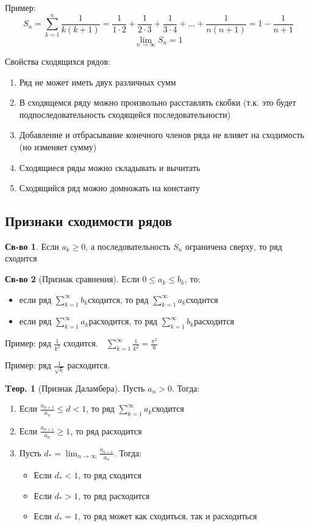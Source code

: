 \documentclass[a4paper,12pt]{article}
\numberwithin{figure}{section}
\theoremstyle{definition}
\newtheorem*{property}{Св-во}  %
\theoremstyle{definition}
\newtheorem{theorem}{Tеор.}[section]
\def\DS{\displaystyle}
\def\ntoinf{n\to\infty}
\def\leqs{\leqslant}
\def\geqs{\geqslant}
\def\rowak{$\DS\sum_{k=1}^{\infty}a_k$\space}
\begin{document}
\bigbreak
Пример:
\[ S_n = \sum_{k=1}^n \frac1{k(k+1)}
       = \frac1{1\cdot2} + \frac1{2\cdot3} + \frac1{3\cdot4} + ... + \frac1{n(n+1)}
       = 1 - \frac1{n+1} \]
\[ \lim_{\ntoinf}S_n = 1 \]
\bigskip

Свойства сходящихся рядов:
\begin{enumerate}
	\item Ряд не может иметь двух различных сумм
	\item В сходящемся ряду можно произвольно расставлять скобки
		  (т.к. это будет подпоследовательность сходящейся последовательности)
	\item Добавление и отбрасывание конечного членов ряда не влияет на сходимость (но изменяет сумму)
	\item Сходящиеся ряды можно складывать и вычитать
	\item Сходящийся ряд можно домножать на константу
\end{enumerate}


\subsection{Признаки сходимости рядов}

\begin{property}
	Если $a_k\geqs0$, а последовательность $S_n$ ограничена сверху, то ряд сходится
\end{property}

\begin{property}[Признак сравнения]
	Если $0 \leqs a_k \leqs b_k$, то:
	\begin{itemize}
		\def\rowbk{$\DS\sum_{k=1}^{\infty}b_k$\space}
		\item если ряд \rowbk сходится, то ряд \rowak сходится
		\item если ряд \rowak расходится, то ряд \rowbk расходится
	\end{itemize}
\end{property}

Пример: ряд $\DS\frac1{k^2}$ сходится. $\;$
$\DS\sum_{k=1}^\infty \frac1{k^2} = \frac{\pi^2}6 $

\bigbreak
Пример: ряд $\DS\frac1{\sqrt{k}}$ расходится.

\begin{theorem}[Признак Даламбера]
  Пусть $a_n > 0$. Тогда:
  \begin{enumerate}
	\item Если $\DS\frac{a_{n+1}}{a_n} \leqs d < 1$, то ряд \rowak сходится
	\item Если $\DS\frac{a_{n+1}}{a_n} \geqs 1$, то ряд расходится
	\item Пусть $\DS d_* = \lim_{\ntoinf} \frac{a_{n+1}}{a_n}$. Тогда:
	  \begin{itemize}
	  	\item Если $d_* < 1$, то ряд сходится
	  	\item Если $d_* > 1$, то ряд расходится
	  	\item Если $d_* = 1$, то ряд может как сходиться, так и расходиться
	  \end{itemize}
  \end{enumerate}
\end{theorem}
\end{document}

